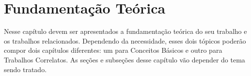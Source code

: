 \chapter[Fundamentação Teórica]{Fundamentação Teórica}

Nesse capítulo devem ser apresentados a fundamentação teórica do seu trabalho e os trabalhos relacionados. Dependendo da necessidade, esses dois tópicos  poderão compor dois capítulos diferentes: um para Conceitos Básicos e  outro para Trabalhos Correlatos. As seções e subseções desse capítulo vão depender do tema sendo tratado.